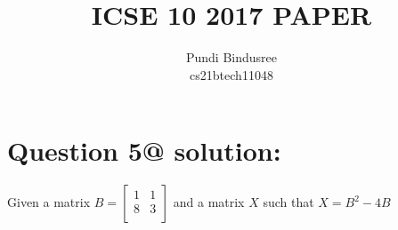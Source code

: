 \documentclass{article}
\begin{document}
\title{\huge ICSE 10 2017 PAPER}
\author{\Small Pundi Bindusree\\ \small cs21btech11048  }
\maketitle
\vspace{-12pt}

\section*{\Small Question 5@ solution:}

Given a matrix $ B = \begin{bmatrix}
1 & 1 \\
8 & 3 \\
\end{bmatrix} $
and a matrix \(X\) such that $X = B^2 - 4B $
\end{document}
